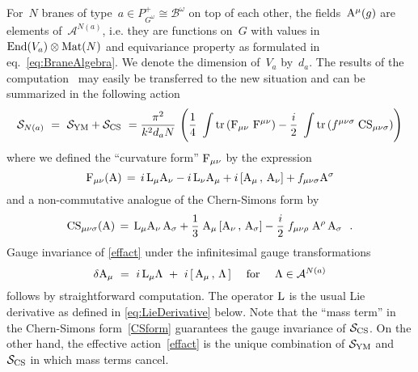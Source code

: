 \documentclass[12pt,a4paper]{article}
\newcommand{\tr}{\text{tr}}
\newcommand{\mc}{\mathcal} %
\def\iG{G^\omega} %
\def\bL{\mc{B}} %
\def\reps{P^+} %
\def\treps{\bL^\omega} %
\def\End{{\text{\rm End}}} %
\def\Mat{{\text{\rm Mat}}} %
\def\tCS{{\rm CS}}
\def\cS{{\mathcal S}}
\def\tF{{\rm F}}
\def\tf{{f}}
\def\tA{{\rm A}}
\def\tL{{\rm L}}
\def\astk{\, , \, }
\begin{document}
For~$N$ branes of type~$a\in\reps_{\iG}\cong\treps$ on top of each 
other, the fields~$\tA^\mu(g)$ are elements of~$\mc{A}^{N(a)}$, i.e.
they are functions on~$G$ with values in $\End(V_a)\otimes \Mat(N)$ 
and equivariance property as formulated in eq.~\eqref{eq:BraneAlgebra}.
We denote the dimension of~$V_a$ by~$d_a$.
The results of the computation~\cite{Alekseev:2000fd} may easily be 
transferred to the new situation and can be summarized in the 
following action
\begin{equation}
  \label{effact}
  \cS_{N(a)}\ =\  \cS_{{\rm YM}} + \cS_{{\rm CS}}\
     =\frac{\pi^2}{k^2d_aN}\
      \Biggl(\frac{1}{4}\ \int\tr \left( \tF_{\mu\nu} \ \tF^{\mu\nu} \right) 
             - \frac{i}{2}\  \int\tr \left( \tf^{\mu\nu\sigma}\; \tCS_{\mu\nu\sigma}
      \right)\Biggr)
\end{equation}
 where we defined the ``curvature form'' $\tF_{\mu\nu}$ by the expression     
\begin{equation}
  \label{fieldstr}
  \tF_{\mu\nu}(\tA)\, = \,   
   i\, \tL_\mu \tA_\nu - i\, \tL_\nu \tA_\mu + i \,[ \tA_\mu \astk \tA_\nu] 
   +  \tf_{\mu\nu\sigma} \tA^\sigma
\end{equation}
and a non-commutative analogue of the Chern-Simons form by 
\begin{equation}
  \label{CSform}
  \tCS_{\mu\nu\sigma}(\tA)\, = \, \tL_\mu \tA_\nu \, \tA_\sigma 
                   + \frac{1}{3}\; \tA_\mu \, [ \tA_\nu \astk \tA_\sigma]
                   - \frac{i}{2}\; \tf_{\mu\nu\rho}\; \tA^\rho \, \tA_\sigma \ \ .
\end{equation}
Gauge invariance of \eqref{effact} under  the infinitesimal 
gauge transformations
\begin{equation}
\label{eq:GaugeTrafos}
 \delta\tA_\mu  \ = \ i\,\tL_\mu \Lambda \ +\  i\, [\, \tA_\mu\, ,\, 
    \Lambda\, ]  \ \ \ \text{ for } \ \ \ \Lambda \in 
    \mc{A}^{N(a)} 
\end{equation}
follows by straightforward computation. The operator $\tL$ is the 
usual Lie derivative as defined in \eqref{eq:LieDerivative} below.
Note that the ``mass term'' 
in the Chern-Simons form~\eqref{CSform} guarantees the gauge 
invariance of $\cS_{{\rm CS}}$. On the other hand, the effective 
action~\eqref{effact} is the unique combination of $\cS_{\rm YM}$ 
and $\cS_{\rm CS}$ in which mass terms cancel. 
\smallskip
\end{document}
